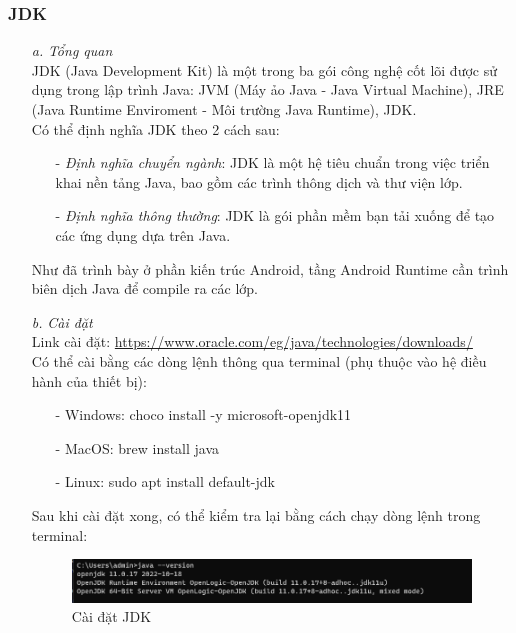 \subsubsection{JDK}
\begin{enumerate}
    \item[\textit{a.}] {\textit{Tổng quan}}\\
    JDK (Java Development Kit) là một trong ba gói công nghệ cốt lõi được sử dụng trong lập trình Java: JVM (Máy ảo Java - Java Virtual Machine), JRE (Java Runtime Enviroment - Môi trường Java Runtime), JDK.\\
    Có thể định nghĩa JDK theo 2 cách sau:
    \begin{enumerate}
        \item[-] {\textit{Định nghĩa chuyển ngành}}: JDK là một hệ tiêu chuẩn trong việc triển khai nền tảng Java, bao gồm các trình thông dịch và thư viện lớp.
        \item[-] {\textit{Định nghĩa thông thường}}: JDK là gói phần mềm bạn tải xuống để tạo các ứng dụng dựa trên Java.
    \end{enumerate}
    Như đã trình bày ở phần kiến trúc Android, tầng Android Runtime cần trình biên dịch Java để compile ra các lớp.
    \item[\textit{b.}] {\textit{Cài đặt}}\\
    Link cài đặt: \url{https://www.oracle.com/eg/java/technologies/downloads/}\\
    Có thể cài bằng các dòng lệnh thông qua terminal (phụ thuộc vào hệ điều hành của thiết bị):
    \begin{enumerate}
        \item[-] {Windows}: choco install -y microsoft-openjdk11
        \item[-] {MacOS}: brew install java
        \item[-] {Linux}: sudo apt install default-jdk
    \end{enumerate}
    Sau khi cài đặt xong, có thể kiểm tra lại bằng cách chạy dòng lệnh trong terminal:
    \begin{figure}[!ht]
        \centering
        \includegraphics[scale=0.5]{images/checkJDK.png}
        \caption{Cài đặt JDK}
    \end{figure}
\end{enumerate}
